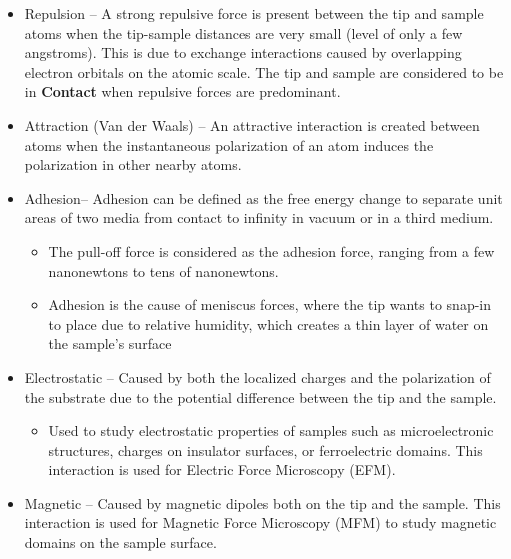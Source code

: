 \documentclass{../lab}
\begin{document}
\begin{itemize}
    \item Repulsion -- A strong repulsive force is present between the tip and sample atoms when the tip-sample distances are very small (level of only a few angstroms).  This is due to exchange interactions caused by overlapping electron orbitals on the atomic scale. The tip and sample are considered to be in \textbf{Contact} when repulsive forces are predominant.

    \item Attraction (Van der Waals) -- An attractive interaction is created between atoms when the instantaneous polarization of an atom induces the polarization in other nearby atoms. 

    \item Adhesion-- Adhesion can be defined as the free energy change to separate unit areas of two media from contact to infinity in vacuum or in a third medium.

         \begin{itemize}
             \item The pull-off force is considered as the adhesion force, ranging from a few nanonewtons to tens of nanonewtons.

             \item Adhesion is the cause of meniscus forces, where the tip wants to snap-in to place due to relative humidity, which creates a thin layer of water on the sample's surface
         \end{itemize}

         \item Electrostatic -- Caused by both the localized charges and the polarization of the substrate due to the potential difference between the tip and the sample.

         \begin{itemize}
             \item Used to study electrostatic properties of samples such as microelectronic structures, charges on insulator surfaces, or ferroelectric domains. This interaction is used for Electric Force Microscopy (EFM). 
         \end{itemize}

         \item Magnetic -- Caused by magnetic dipoles both on the tip and the sample. This interaction is used for Magnetic Force Microscopy (MFM) to study magnetic domains on the sample surface.

     \end{itemize}
\end{document}

